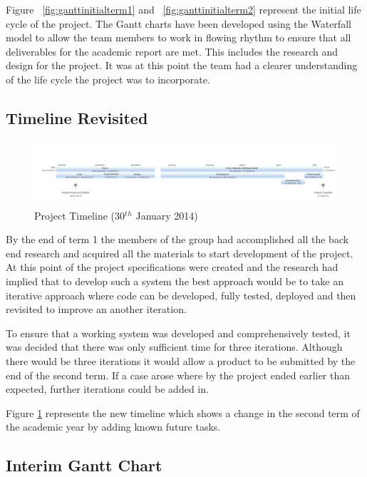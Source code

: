 \begin{landscape}
Figure ~\ref{fig:ganttinitialterm1} and ~\ref{fig:ganttinitialterm2} represent
the initial life cycle of the project. The Gantt charts have been developed
using the Waterfall model to allow the team members to work in flowing rhythm to
ensure that all deliverables for the academic report are met. This includes the
research and design for the project. It was at this point the team had a clearer
understanding of the life cycle the project was to incorporate.


\newpage
\subsection{Timeline Revisited}

\begin{figure}[H]
  \centering
  \includegraphics[width=\linewidth]{images/timeline2.png}
  \caption{Project Timeline (30$^t$$^h$ January 2014)}
  \label{fig:timeline2}
\end{figure}

By the end of term 1 the members of the group had accomplished all the back end
research and acquired all the materials to start development of the project. At
this point of the project  specifications were created and the research had
implied that to develop such a system the best approach would be to take an
iterative approach where code can be developed, fully tested, deployed and then
revisited to improve an another iteration.

To ensure that a working system was developed and comprehensively tested, it was
decided that there was only sufficient time for three iterations. Although there
would be three iterations it would allow a product to be submitted by the end of
the second term. If a case arose where by the project ended earlier than 
expected, further iterations could be added in. 

Figure \ref{fig:timeline2} represents the new timeline which shows a change in 
the second term of the academic year by adding known future tasks.


\newpage 
\subsection{Interim Gantt Chart}


\end{landscape}
